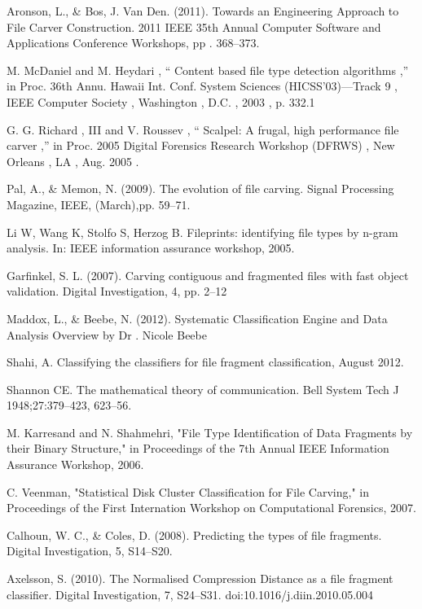 Aronson, L., \& Bos, J. Van Den. (2011). Towards an Engineering Approach to File Carver Construction. 2011 IEEE 35th Annual Computer Software and Applications Conference Workshops, pp . 368–373.

M. McDaniel and M. Heydari , “ Content based file type detection algorithms ,” in Proc. 36th Annu. Hawaii Int. Conf. System Sciences (HICSS’03)—Track 9 , IEEE Computer Society , Washington , D.C. , 2003 , p. 332.1

G. G. Richard , III and V. Roussev , “ Scalpel: A frugal, high performance file carver ,” in Proc. 2005 Digital Forensics Research Workshop (DFRWS) , New Orleans , LA , Aug. 2005 .

Pal, A., \& Memon, N. (2009). The evolution of file carving. Signal Processing Magazine, IEEE, (March),pp. 59–71.

Li W, Wang K, Stolfo S, Herzog B. Fileprints: identifying file types by n-gram analysis. In: IEEE information assurance workshop, 2005.

Garfinkel, S. L. (2007). Carving contiguous and fragmented files with fast object validation. Digital Investigation, 4, pp. 2–12

Maddox, L., \& Beebe, N. (2012). Systematic Classification Engine and Data Analysis Overview by Dr . Nicole Beebe

Shahi, A. Classifying the classifiers for file fragment classification, August 2012.

Shannon CE. The mathematical theory of communication. Bell System Tech J 1948;27:379–423, 623–56.

M. Karresand and N. Shahmehri, "File Type Identification of Data Fragments by their Binary Structure," in Proceedings of the 7th Annual IEEE Information Assurance Workshop, 2006.

C. Veenman, "Statistical Disk Cluster Classification for File Carving," in Proceedings of the First Internation Workshop on Computational Forensics, 2007.

Calhoun, W. C., \& Coles, D. (2008). Predicting the types of file fragments. Digital Investigation, 5, S14–S20.


Axelsson, S. (2010). The Normalised Compression Distance as a file fragment classifier. Digital Investigation, 7, S24–S31. doi:10.1016/j.diin.2010.05.004

